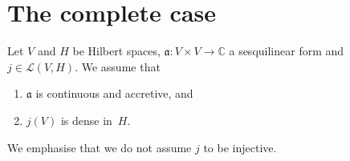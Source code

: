 \documentclass[a4paper,oneside,12pt]{amsart}
\theoremstyle{plain}
\theoremstyle{definition}
\begin{document}
\section{The complete case}\label{sec:complete-case}

Let $V$ and $H$ be Hilbert spaces, ${{\mathfrak{{a}}}}\colon V\times V\to{\mathbb{C}}$ a sesquilinear form and $j\in{\mathcal{L}}(V,H)$.
We assume that
\begin{enumerate}[\upshape (I)]
\item\label{en:ass-one} ${{\mathfrak{{a}}}}$ is continuous and accretive, and
\item\label{en:ass-two} $j(V)$ is dense in~$H$.
\end{enumerate}
We emphasise that we do not assume $j$ to be injective.
\end{document}
